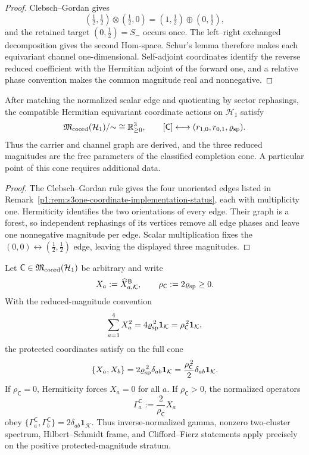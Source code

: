 \documentclass[11pt]{article}
\begin{document}
\begin{proof}
Clebsch--Gordan gives
\[
 (\tfrac12,\tfrac12)\otimes(\tfrac12,0)
 =(1,\tfrac12)\oplus(0,\tfrac12),
\]
and the retained target \((0,\tfrac12)=S_-\) occurs once.  The
left--right exchanged decomposition gives the second Hom-space.  Schur's
lemma therefore makes each equivariant channel one-dimensional.  Self-adjoint
coordinates identify the reverse reduced coefficient with the Hermitian
adjoint of the forward one, and a relative phase convention makes the common
magnitude real and nonnegative.
\end{proof}

\begin{corollary}
\label{p1:cor:level-one-coordinate-completion-moduli}
After matching the normalized scalar edge and quotienting by sector
rephasings, the compatible Hermitian equivariant coordinate actions on
\(\mathcal H_1\) satisfy
\[
 \mathfrak M_{\rm coord}(\mathcal H_1)/{\sim}
 \cong \mathbb R_{\ge0}^{3},
 \qquad
 [\mathsf C]\longleftrightarrow
 (r_{1,0},r_{0,1},\varrho_{\rm sp}).
\]
Thus the carrier and channel graph are derived, and the three reduced
magnitudes are the free parameters of the classified completion cone.
A particular point of this cone requires additional data.
\end{corollary}

\begin{proof}
The Clebsch--Gordan rule gives the four unoriented edges listed in
Remark~\ref{p1:rem:s3one-coordinate-implementation-status}, each with
multiplicity one.  Hermiticity identifies the two orientations of every
edge.  Their graph is a forest, so independent rephasings of its vertices
remove all edge phases and leave one nonnegative magnitude per edge.  Scalar
multiplication fixes the \((0,0)\leftrightarrow(\tfrac12,\tfrac12)\) edge,
leaving the displayed three magnitudes.
\end{proof}

\begin{proposition}
\label{p1:prop:general-protected-clifford-relation}
Let \(\mathsf C\in\mathfrak M_{\rm coord}(\mathcal H_1)\) be arbitrary and
write
\[
 X_a:=\widehat X_{a,\mathcal K}^{\mathsf B},
 \qquad
 \rho_{\mathsf C}:=2\varrho_{\rm sp}\ge0.
\]
With the reduced-magnitude convention
\[
 \sum_{a=1}^4X_a^2=4\varrho_{\rm sp}^{\,2}\mathbf1_{\mathcal K}
 =\rho_{\mathsf C}^{\,2}\mathbf1_{\mathcal K},
\]
the protected coordinates satisfy on the full cone
\[
 \{X_a,X_b\}
 =2\varrho_{\rm sp}^{\,2}\delta_{ab}\mathbf1_{\mathcal K}
 =\frac{\rho_{\mathsf C}^{\,2}}2\delta_{ab}\mathbf1_{\mathcal K}.
\]
If \(\rho_{\mathsf C}=0\), Hermiticity forces \(X_a=0\) for all \(a\).
If \(\rho_{\mathsf C}>0\), the normalized operators
\[
 \Gamma_a^{\mathsf C}:=\frac{2}{\rho_{\mathsf C}}X_a
\]
obey
\(\{\Gamma_a^{\mathsf C},\Gamma_b^{\mathsf C}\}
=2\delta_{ab}\mathbf1_{\mathcal K}\).  Thus inverse-normalized gamma,
nonzero two-cluster spectrum, Hilbert--Schmidt frame, and Clifford--Fierz
statements apply precisely on the positive protected-magnitude stratum.
\end{proposition}
\end{document}
